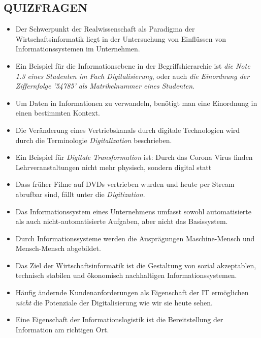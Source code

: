 \documentclass[12pt,a4paper]{article}
\begin{document}
\newpage
\subsection{QUIZFRAGEN} %
\begin{itemize}
   \item Der Schwerpunkt der Realwissenschaft als Paradigma der Wirtschaftsinformatik liegt in der Untersuchung von Einflüssen von Informationssystemen im Unternehmen.
   
   \item Ein Beispiel für die Informationsebene in der Begriffshierarchie ist \emph{die Note 1.3 eines Studenten im Fach Digitalisierung}, oder auch \emph{die Einordnung der Ziffernfolge '54785' als Matrikelnummer eines Studenten}.
   \item Um Daten in Informationen zu verwandeln, benötigt man eine Einordnung in einen bestimmten Kontext.
   
   \item Die Veränderung eines Vertriebskanals durch digitale Technologien wird durch die Terminologie \emph{Digitalization} beschrieben.
   \item Ein Beispiel für \emph{Digitale Transformation} ist: Durch das Corona Virus finden Lehrveranstaltungen nicht mehr physisch, sondern digital statt
   \item Dass früher Filme auf DVDs vertrieben wurden und heute per Stream abrufbar sind, fällt unter die \emph{Digitization}.
   
   \item Das Informationssystem eines Unternehmens umfasst sowohl automatisierte als auch nicht-automatisierte Aufgaben, aber nicht das Basissystem.
   
   \item Durch Informationssysteme werden die Ausprägungen Maschine-Mensch und Mensch-Mensch abgebildet.
   
   \item Das Ziel der Wirtschaftsinformatik ist die Gestaltung von sozial akzeptablen, technisch stabilen und ökonomisch nachhaltigen Informationssystemen.
   
   \item Häufig ändernde Kundenanforderungen als Eigenschaft der IT ermöglichen \emph{nicht} die Potenziale der Digitalisierung wie wir sie heute sehen.
   
   \item Eine Eigenschaft der Informationslogistik ist die Bereitstellung der Information am richtigen Ort.
\end{itemize}
\end{document}
